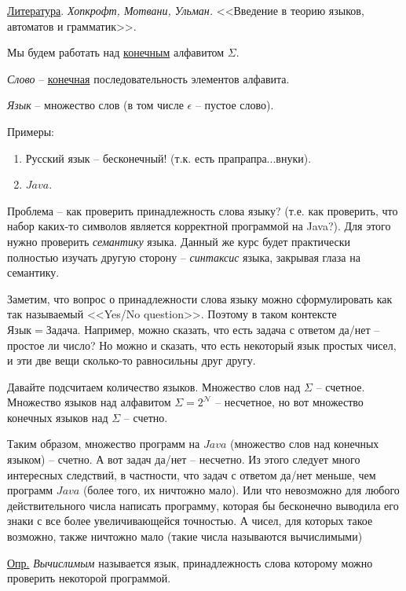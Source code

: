 \documentclass[fleqn, 12pt]{article}
\begin{document}
\underline{Литература}. \textit{Хопкрофт, Мотвани, Ульман.} <<Введение в теорию языков, автоматов и грамматик>>.

Мы будем работать над \underline{конечным} алфавитом $ \Sigma $.

\textit{Слово} -- \underline{конечная} последовательность элементов алфавита.

\textit{Язык} -- множество слов (в том числе $ \epsilon $ -- пустое слово).

Примеры:

\begin{enumerate}
	\item Русский язык -- бесконечный! (т.к. есть прапрапра...внуки).
	
	\item $ Java $.
	
\end{enumerate} 

Проблема -- как проверить принадлежность слова языку? (т.е. как проверить, что набор каких-то символов является корректной программой на Java?). Для этого нужно проверить \textit{семантику} языка. Данный же курс будет практически полностью изучать другую сторону -- \textit{синтаксис} языка, закрывая глаза на семантику. 

Заметим, что вопрос о принадлежности слова языку можно сформулировать как так называемый <<Yes/No question>>. Поэтому в таком контексте $ Язык = Задача $. Например, можно сказать, что есть задача с ответом да/нет -- простое ли число? Но можно и сказать, что есть некоторый язык простых чисел, и эти две вещи сколько-то равносильны друг другу.

Давайте подсчитаем количество языков. Множество слов над $ \Sigma $ -- счетное. Множество языков над алфавитом $ \Sigma = 2^{\mathcal{N}}$ -- несчетное, но вот множество конечных языков над $ \Sigma $ -- счетно. 

Таким образом, множество программ на $ Java $ (множество слов над конечных языком) -- счетно. А вот задач да/нет -- несчетно. Из этого следует много интересных следствий, в частности, что задач с ответом да/нет меньше, чем программ $ Java $ (более того, их ничтожно мало). Или что невозможно для любого действительного числа написать программу, которая бы бесконечно выводила его знаки с все более увеличивающейся точностью. А чисел, для которых такое возможно, также ничтожно мало (такие числа называются вычислимыми)

\underline{Опр.} \textit{Вычислимым} называется язык, принадлежность слова которому можно проверить некоторой программой. 
\end{document}
